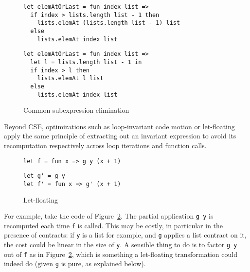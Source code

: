 \documentclass[sigplan,10pt,review,anonymous]{acmart}
\begin{document}
\begin{figure}[h]
  \begin{center}
\begin{lstlisting}[language=nickel,title={Source program}]
let elemAtOrLast = fun index list =>
  if index > lists.length list - 1 then
    lists.elemAt (lists.length list - 1) list
  else
    lists.elemAt index list
\end{lstlisting}
\begin{lstlisting}[language=nickel,title={Optimized program}]
let elemAtOrLast = fun index list =>
  let l = lists.length list - 1 in
  if index > l then
    lists.elemAt l list
  else
    lists.elemAt index list
\end{lstlisting}
  \end{center}
\caption{Common subexpression elimination}
\label{fig:optimizations-cse-ex}
\end{figure}

Beyond CSE, optimizations such as loop-invariant code motion or
let-floating~\cite{letFloating} apply the same principle of extracting out an invariant
expression to avoid its recomputation respectively across loop iterations and
function calls.

\begin{figure}
  \begin{center}
\begin{lstlisting}[language=nickel,title={Source program}]
let f = fun x => g y (x + 1)
\end{lstlisting}
\begin{lstlisting}[language=nickel,title={Optimized program}]
let g' = g y
let f' = fun x => g' (x + 1)
\end{lstlisting}
  \end{center}
\caption{Let-floating}
\label{fig:optimizations-let-floating-ex}
\end{figure}

For example, take the code of Figure~\ref{fig:optimizations-let-floating-ex}.
The partial application \lstinline+g y+ is recomputed each time \lstinline+f+ is
called. This may be costly, in particular in the presence of contracts: if
\lstinline+y+ is a list for example, and \lstinline+g+ applies a list contract
on it, the cost could be linear in the size of \lstinline+y+. A sensible thing
to do is to factor \lstinline+g y+ out of \lstinline+f+ as in
Figure~\ref{fig:optimizations-let-floating-ex}, which is something a
let-floating transformation could indeed do (given \lstinline+g+ is pure, as
explained below).
\end{document}
